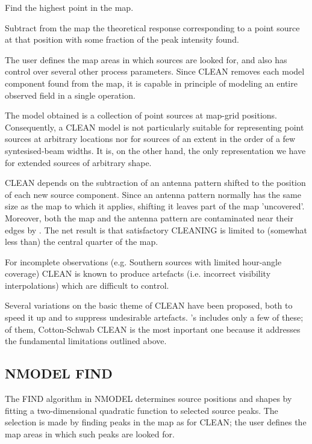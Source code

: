 \bi
\item   Find the highest point in the map.

\item   Subtract from the map the theoretical response corresponding to a point
source at that position with some fraction of the peak intensity found.
\ei

\noi    The user defines the map areas in which sources are looked for, and
also has control over several other process parameters. Since CLEAN removes
each model component found from the map, it is capable in principle of modeling
an entire observed field in a single operation.

	The model obtained is a collection of point sources at map-grid
positions. Consequently, a CLEAN model is not particularly suitable for
representing point sources at arbitrary locations nor for sources of an extent
in the order of a few syntesised-beam widths. It is, on the other hand, the
only representation we have for extended sources of arbitrary shape.

	CLEAN depends on the subtraction of an antenna pattern shifted to the
position of each new source component. Since an antenna pattern normally has
the same size as the map to which it applies, shifting it leaves part of the
map 'uncovered'. Moreover, both the map and the antenna pattern are
contaminated near their edges by . The net result
is that satisfactory CLEANING is limited to (somewhat less than) the central
quarter of the map.

	For incomplete observations (e.g. Southern sources with limited
hour-angle coverage) CLEAN is known to produce artefacts (i.e. incorrect
visibility interpolations) which are difficult to control.

	Several variations on the basic theme of CLEAN have been proposed, both
to speed it up and to suppress undesirable artefacts. \NEWSTAR's
 includes only a few of these; of them,
Cotton-Schwab CLEAN is the most inportant one because it addresses the
fundamental limitations outlined above.



\subsection{ NMODEL FIND }
\label{.nmodel.find}

	The FIND algorithm in NMODEL determines source positions and shapes by
fitting a two-dimensional quadratic function to selected source peaks. The
selection is made by finding peaks in the map as for CLEAN; the user defines
the map areas in which such peaks are looked for.

